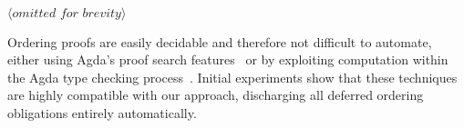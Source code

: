 \documentclass[sigplan]{acmart}%
\begin{document}
\begin{code}
\>[2]\AgdaSpace{}%
\AgdaSymbol{:}\AgdaSpace{}%
\AgdaSpace{}%
\AgdaSpace{}%
\<%
\\
%
\>[2]\AgdaSpace{}%
\AgdaSymbol{=}%
\>[861I]%
\>[862I]\AgdaSpace{}%
\<%
\\
\>[862I][@{}l@{\AgdaIndent{0}}]%
\>[25]\AgdaSymbol{(}\AgdaSpace{}%
\AgdaSpace{}%
\AgdaSpace{}%
\AgdaSymbol{)}\<%
\\
%
\>[25]\AgdaSymbol{(}\AgdaSpace{}%
\<%
\\
\>[25][@{}l@{\AgdaIndent{0}}]%
\>[28]\AgdaSymbol{(}\AgdaSpace{}%
\AgdaSpace{}%
\AgdaSpace{}%
\AgdaSymbol{)}\<%
\\
%
\>[28]\AgdaSymbol{(}\AgdaSpace{}%
\AgdaSpace{}%
\AgdaSpace{}%
\AgdaSymbol{))}\<%
\\
\>[.][@{}l@{}]\<[861I]%
\>[13] \ensuremath{\langle \textit{omitted for brevity} \rangle}\<%
\\
%
\>[13]\<%
\end{code}
Ordering proofs are easily decidable 
and therefore not difficult to automate, either using 
Agda's proof search features~\citep{agsy} or by
exploiting computation within the Agda type checking process~\citep{tyde16}. 
Initial experiments show that these techniques are highly compatible 
with our approach, discharging all deferred ordering obligations entirely automatically.
\end{document}
